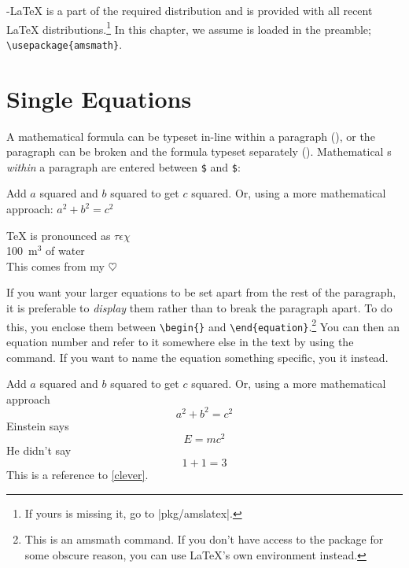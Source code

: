 \AmS-\LaTeX{} is a part of the required distribution and is provided
with all recent \LaTeX{} distributions.\footnote{If yours is missing it, go to
  \CTAN|pkg/amslatex|.} In this chapter, we assume
   is loaded in the preamble; \verb|\usepackage{amsmath}|.

\section{Single Equations}
  
A mathematical formula can be typeset in-line within a paragraph (\emph{}), or the paragraph can be broken and the formula typeset separately
(\emph{}). Mathematical s 
\emph{within} a paragraph are entered  %
between \texttt{\$} and \texttt{\$}:
\begin{example}
Add $a$ squared and $b$ squared
to get $c$ squared. Or, using 
a more mathematical approach:
$a^2 + b^2 = c^2$
\end{example}
\begin{example}
\TeX{} is pronounced as 
$\tau\epsilon\chi$\\[5pt]
100~m$^{3}$ of water\\[5pt]
This comes from my $\heartsuit$
\end{example}

If you want your larger equations to be set apart
from the rest of the paragraph, it is preferable to \emph{display} them
rather than to break the paragraph apart.
To do this, you enclose them between \verb|\begin{|\verb|}| and
\verb|\end{equation}|.\footnote{This is an \textsf{amsmath} command. If you don't
have access to the package for some obscure reason, you can use \LaTeX's own
 environment instead.} You can then  an equation number and refer to
it somewhere else in the text by using the  command. If you want to
name the equation something specific, you  it instead.
\begin{example}
Add $a$ squared and $b$ squared
to get $c$ squared. Or, using
a more mathematical approach
 \begin{equation}
   a^2 + b^2 = c^2
 \end{equation}
Einstein says
 \begin{equation}
   E = mc^2 \label{clever}
 \end{equation}
He didn't say
 \begin{equation}
  1 + 1 = 3 \tag{dumb}
 \end{equation}
This is a reference to 
\eqref{clever}. 
\end{example}

